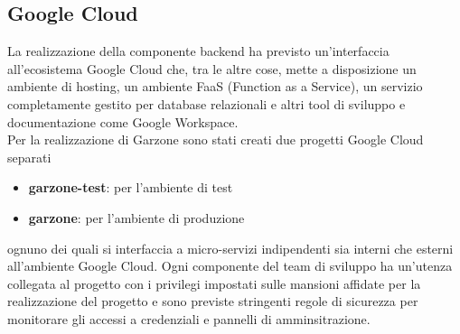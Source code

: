 \subsection{Google Cloud}
La realizzazione della componente backend ha previsto un'interfaccia all'ecosistema Google Cloud che, tra le altre cose, mette a disposizione un ambiente di hosting, un ambiente FaaS (Function as a Service), un servizio completamente gestito per database relazionali e altri tool di sviluppo e documentazione come Google Workspace. \\ Per la realizzazione di Garzone sono stati creati due progetti Google Cloud separati
\begin{itemize}
    \item \textbf{garzone-test}: per l'ambiente di test
    \item \textbf{garzone}: per l'ambiente di produzione
\end{itemize} 
ognuno dei quali si interfaccia a micro-servizi indipendenti sia interni che esterni all'ambiente Google Cloud. Ogni componente del team di sviluppo ha un'utenza collegata al progetto con i privilegi impostati sulle mansioni affidate per la realizzazione del progetto e sono previste stringenti regole di sicurezza per monitorare gli accessi a credenziali e pannelli di amminsitrazione. 
